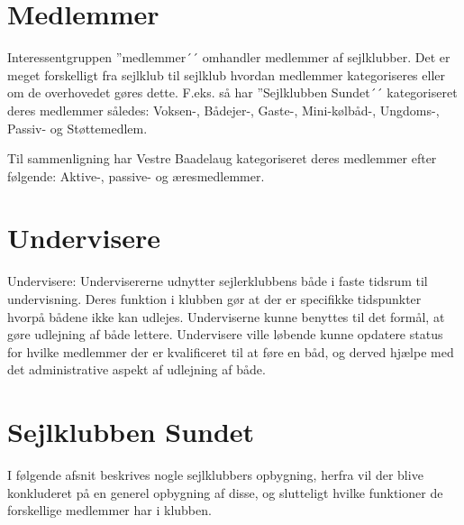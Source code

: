 \section{Medlemmer}

Interessentgruppen ''medlemmer´´ omhandler medlemmer af sejlklubber. Det er meget forskelligt fra sejlklub til
sejlklub hvordan medlemmer kategoriseres eller om de overhovedet gøres dette. F.eks. så har ''Sejlklubben
Sundet´´ kategoriseret deres medlemmer således: Voksen-, Bådejer-, Gaste-, Mini-kølbåd-, Ungdoms-, Passiv- og
Støttemedlem.

Til sammenligning har Vestre Baadelaug kategoriseret deres medlemmer efter følgende: Aktive-, passive- og
æresmedlemmer.




\section{Undervisere}

Undervisere: Undervisererne udnytter sejlerklubbens både i faste tidsrum til undervisning. Deres funktion i
klubben gør at der er specifikke tidspunkter hvorpå bådene ikke kan udlejes. Underviserne kunne benyttes til
det formål, at gøre udlejning af både lettere. Undervisere ville løbende kunne opdatere status for hvilke
medlemmer der er kvalificeret til at føre en båd, og derved hjælpe med det administrative aspekt af udlejning
af både.

\cbend


\section{Sejlklubben Sundet}

I følgende afsnit beskrives nogle sejlklubbers opbygning, herfra vil der blive konkluderet på en generel opbygning af
disse, og slutteligt hvilke funktioner de forskellige medlemmer har i klubben.

